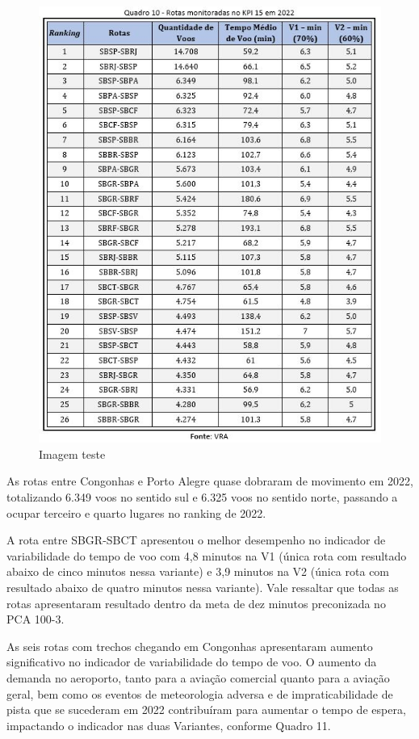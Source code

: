 \documentclass[
]{book}
\begin{document}
\begin{figure}
\centering
\includegraphics{imagens/fig45.jpg}
\caption{Imagem teste}
\end{figure}

As rotas entre Congonhas e Porto Alegre quase dobraram de movimento em 2022, totalizando 6.349 voos no sentido sul e 6.325 voos no sentido norte, passando a ocupar terceiro e quarto lugares no ranking de 2022.

A rota entre SBGR-SBCT apresentou o melhor desempenho no indicador de variabilidade do tempo de voo com 4,8 minutos na V1 (única rota com resultado abaixo de cinco minutos nessa variante) e 3,9 minutos na V2 (única rota com resultado abaixo de quatro minutos nessa variante). Vale ressaltar que todas as rotas apresentaram resultado dentro da meta de dez minutos preconizada no PCA 100-3.

As seis rotas com trechos chegando em Congonhas apresentaram aumento significativo no indicador de variabilidade do tempo de voo. O aumento da demanda no aeroporto, tanto para a aviação comercial quanto para a aviação geral, bem como os eventos de meteorologia adversa e de impraticabilidade de pista que se sucederam em 2022 contribuíram para aumentar o tempo de espera, impactando o indicador nas duas Variantes, conforme Quadro 11.
\end{document}
